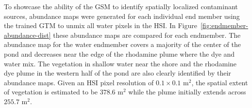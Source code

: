 \documentclass[remotesensing,article,submit,pdftex,moreauthors]{Definitions/mdpi}
\begin{document}
To showcase the ability of the GSM to identify spatially localized contaminant sources, abundance maps were generated for each individual end member using the trained GTM to unmix all water pixels in the HSI. In Figure~\ref{fig:endmember-abundance-dist} these abundance maps are compared for each endmember. The abundance map for the water endmember covers a majority of the center of the pond and decreases near the edge of the rhodamine plume where the dye and water mix. The vegetation in shallow water near the shore and the rhodamine dye plume in the western half of the pond are also clearly identified by their abundance maps. Given an HSI pixel resolution of $0.1 \times 0.1$ $\text{m}^2$, the spatial extent of vegetation is estimated to be $378.6$ $\text{m}^2$ while the plume initially extends across $255.7$ $\text{m}^2$.
\end{document}
